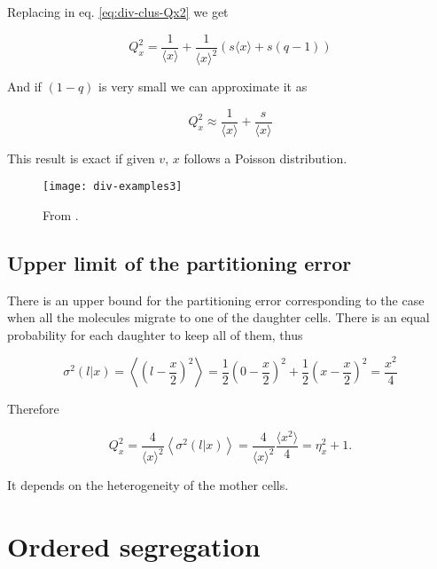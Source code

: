 Replacing in eq. \eqref{eq:div-clus-Qx2} we get

\begin{equation*}
  Q_x^2 = \frac{1}{\langle x\rangle} + \frac{1}{\langle x\rangle^2}\left(s\langle x\rangle+s(q-1)\right)
\end{equation*}

And if $(1-q)$ is very small we can approximate it as

\begin{equation*}
  Q_x^2 \approx \frac{1}{\langle x\rangle} + \frac{s}{\langle x\rangle}
\end{equation*}

This result is exact if given $v$, $x$ follows a Poisson distribution.

\begin{figure}[H]
  \centering
  \texttt{[image: div-examples3]}
  \caption[FILL]{\label{fig:div-examples3} From \cite{pedraza08}.}
\end{figure}


\subsection{Upper limit of the partitioning error}

There is an upper bound for the partitioning error corresponding to the case when all the molecules migrate to one of the daughter cells. There is an equal probability for each daughter to keep all of them, thus

\begin{equation*}
  \sigma^2(l|x) = \left\langle\left(l-\frac{x}{2}\right)^2\right\rangle = \frac{1}{2}\left(0-\frac{x}{2}\right)^2+\frac{1}{2}\left(x-\frac{x}{2}\right)^2 = \frac{x^2}{4}
\end{equation*}

Therefore

\begin{equation*}
  Q_x^2 = \frac{4}{\langle x\rangle^2}\left\langle\sigma^2(l|x)\right\rangle = \frac{4}{\langle x\rangle^2}\frac{\langle x^2\rangle}{4} = \eta_x^2+1.
\end{equation*}

It depends on the heterogeneity of the mother cells.

\section{Ordered segregation}

